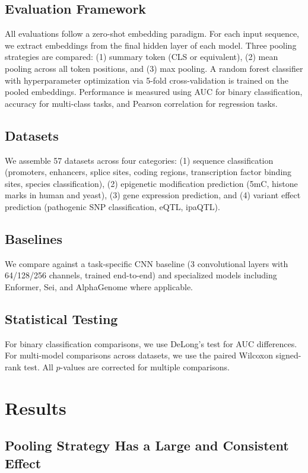 \documentclass[11pt]{article}
\begin{document}
\subsection{Evaluation Framework}
All evaluations follow a zero-shot embedding paradigm. For each input sequence, we extract embeddings from the final hidden layer of each model. Three pooling strategies are compared: (1) summary token (CLS or equivalent), (2) mean pooling across all token positions, and (3) max pooling. A random forest classifier with hyperparameter optimization via 5-fold cross-validation is trained on the pooled embeddings. Performance is measured using AUC for binary classification, accuracy for multi-class tasks, and Pearson correlation for regression tasks.

\subsection{Datasets}
We assemble 57 datasets across four categories: (1) sequence classification (promoters, enhancers, splice sites, coding regions, transcription factor binding sites, species classification), (2) epigenetic modification prediction (5mC, histone marks in human and yeast), (3) gene expression prediction, and (4) variant effect prediction (pathogenic SNP classification, eQTL, ipaQTL).

\subsection{Baselines}
We compare against a task-specific CNN baseline (3 convolutional layers with 64/128/256 channels, trained end-to-end) and specialized models including Enformer, Sei, and AlphaGenome where applicable.

\subsection{Statistical Testing}
For binary classification comparisons, we use DeLong's test for AUC differences. For multi-model comparisons across datasets, we use the paired Wilcoxon signed-rank test. All $p$-values are corrected for multiple comparisons.

\section{Results}

\subsection{Pooling Strategy Has a Large and Consistent Effect}
\end{document}
